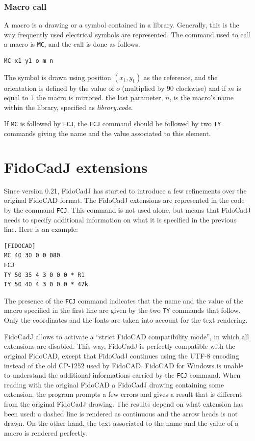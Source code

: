 \documentclass[10pt,a4paper,twoside]{scrreprt}
\begin{document}
\subsubsection{Macro call}

A macro is a drawing or a symbol contained in a library.
Generally, this is the way frequently used electrical symbols are
represented. The command used to call a macro is \lstinline!MC!,
and the call is done as follows:
\begin{lstlisting}
MC x1 y1 o m n
\end{lstlisting}
The symbol is drawn using position $(x_{1},y_{1})$
as the reference, and the orientation is defined by the value of $o$
(multiplied by 90\textdegree{} clockwise) and if $m$ is equal to 1 the macro
is mirrored. the last parameter, $n$, is the macro's name within
the library, specified as \emph{library.code}.

If \lstinline!MC! is followed by \lstinline!FCJ!, the \lstinline!FCJ! command should be followed by two \lstinline!TY! commands giving the name and the value associated to this element.

\section{FidoCadJ extensions}
\label{FCJ_extension}
Since version 0.21, FidoCadJ has started to introduce a few refinements over the original FidoCAD format. The FidoCadJ extensions are represented in the code by the command \lstinline!FCJ!. This command is not used alone, but means that FidoCadJ needs to specify additional information on what it is specified in the previous line.
Here is an example:
\begin{lstlisting}
[FIDOCAD]
MC 40 30 0 0 080
FCJ
TY 50 35 4 3 0 0 0 * R1
TY 50 40 4 3 0 0 0 * 47k
\end{lstlisting}
The presence of the \lstinline!FCJ! command indicates that the name and the value of the macro specified in the first line are given by the two \lstinline!TY! commands that follow. Only the coordinates and the fonts are taken into account for the text rendering.

FidoCadJ allows to activate a ``strict FidoCAD compatibility mode'', in which all extensions are disabled. This way, FidoCadJ is perfectly compatible with the original FidoCAD, except that FidoCadJ continues using the UTF-8 encoding instead of the old CP-1252 used by FidoCAD.
FidoCAD for Windows is unable to understand the additional informations carried by the \lstinline!FCJ! command. When reading with the original FidoCAD a FidoCadJ drawing containing some extension, the program prompts a few errors and gives a result that is different from the original FidoCadJ drawing.
The results depend on what extension has been used: a dashed line is rendered as continuous and the arrow heads is not drawn. On the other hand, the text associated to the name and the value of a macro is rendered perfectly.
\end{document}
